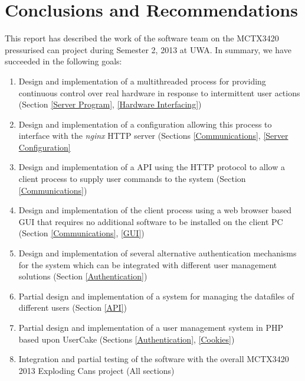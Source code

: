 \chapter{Conclusions and Recommendations}

This report has described the work of the software team on the MCTX3420 pressurised can project during Semester 2, 2013 at UWA.
In summary, we have succeeded in the following goals:

\begin{enumerate}
	\item Design and implementation of a multithreaded process for providing continuous control over real hardware in response to intermittent user actions (Section \ref{Server Program}, \ref{Hardware Interfacing})
	\item Design and implementation of a configuration allowing this process to interface with the \emph{nginx} HTTP server (Sections \ref{Communications}, \ref{Server Configuration}
	\item Design and implementation of a API using the HTTP protocol to allow a client process to supply user commands to the system (Section \ref{Communications})
	\item Design and implementation of the client process using a web browser based GUI that requires no additional software to be installed on the client PC (Section \ref{Communications}, \ref{GUI})
	\item Design and implementation of several alternative authentication mechanisms for the system which can be integrated with different user management solutions (Section \ref{Authentication})
	\item Partial design and implementation of a system for managing the datafiles of different users (Section \ref{API})
	\item Partial design and implementation of a user management system in PHP based upon UserCake (Sections \ref{Authentication}, \ref{Cookies})
	\item Integration and partial testing of the software with the overall MCTX3420 2013 Exploding Cans project (All sections)
\end{enumerate}

